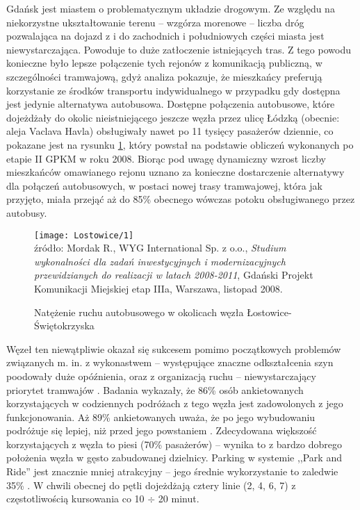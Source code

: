 \documentclass[twoside,12pt]{article}
\begin{document}
	Gdańsk jest miastem o problematycznym układzie drogowym. Ze względu na niekorzystne ukształtowanie terenu -- wzgórza morenowe -- liczba dróg pozwalająca na dojazd z i do zachodnich i południowych części miasta jest niewystarczająca. Powoduje to duże zatłoczenie istniejących tras. Z tego powodu konieczne było lepsze połączenie tych rejonów z komunikacją publiczną, w szczególności tramwajową, gdyż analiza pokazuje, że mieszkańcy preferują korzystanie ze środków transportu indywidualnego w przypadku gdy dostępna jest jedynie alternatywa autobusowa. Dostępne połączenia autobusowe, które dojeżdżały do okolic nieistniejącego jeszcze węzła przez ulicę Łódzką (obecnie: aleja Vaclava Havla) obsługiwały nawet po 11 tysięcy pasażerów dziennie, co pokazane jest na rysunku \ref{lostowice2}, który powstał na podstawie obliczeń wykonanych po etapie II GPKM w roku 2008. Biorąc pod uwagę dynamiczny wzrost liczby mieszkańców omawianego rejonu uznano za konieczne dostarczenie alternatywy dla połączeń autobusowych, w postaci nowej trasy tramwajowej, która jak przyjęto, miała przejąć aż do 85\% obecnego wówczas potoku obsługiwanego przez autobusy.
	
	\begin{figure}[H]
		\centering
		\caption{Natężenie ruchu autobusowego w okolicach węzła Łostowice-Świętokrzyska}
		\texttt{[image: Lostowice/1]}\\
		\footnotesize{źródło: Mordak R., WYG International Sp. z o.o., \emph{Studium wykonalności dla zadań inwestycyjnych i 
		modernizacyjnych przewidzianych do realizacji w latach 2008-2011}, Gdański Projekt Komunikacji Miejskiej etap IIIa, 
		Warszawa, listopad 2008. \cite{opracowanie_gdansk}}
		\label{lostowice2}
	\end{figure}
	
	Węzeł ten niewątpliwie okazał się sukcesem pomimo początkowych problemów związanych m. in. z wykonastwem -- występujące znaczne odkształcenia szyn poodowały duże opóźnienia, oraz z organizacją ruchu -- niewystarczający priorytet tramwajów \cite{kaszubowski}. Badania wykazały, że 86\% osób ankietowanych korzystających w codziennych podróżach z tego węzła jest zadowolonych z jego funkcjonowania. Aż 89\% ankietowanych uważa, że po jego wybudowaniu podróżuje się lepiej, niż przed jego powstaniem \cite{maciej_lada}. Zdecydowana większość korzystających z węzła to piesi (70\% pasażerów) -- wynika to z bardzo dobrego położenia węzła w gęsto zabudowanej dzielnicy. Parking w systemie ,,Park and Ride'' jest znacznie mniej atrakcyjny -- jego średnie wykorzystanie to zaledwie 35\% \cite{kaszubowski}. W chwili obecnej do pętli dojeżdżają cztery linie (2, 4, 6, 7) z częstotliwością kursowania co 10 $\div$ 20 minut. 
	
\end{document}

